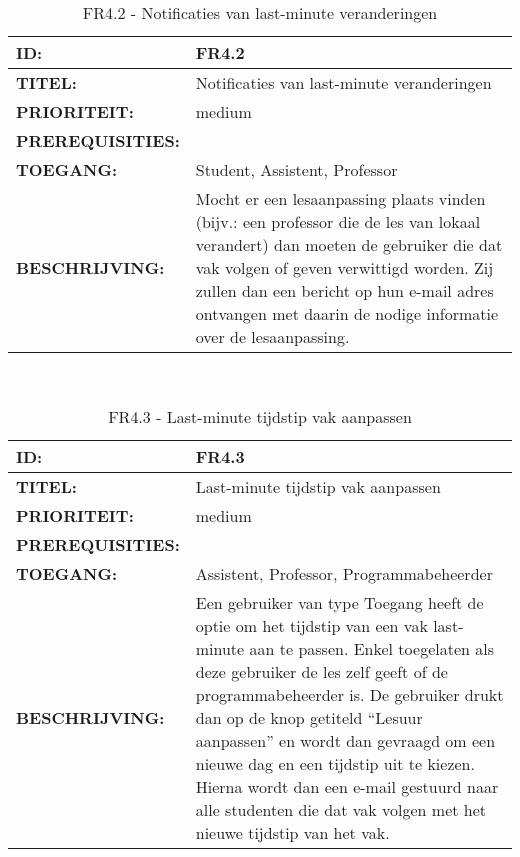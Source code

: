 \noindent\begin{table}[H]
            \begin{tabular}{l | p{10cm}}
                \textbf{ID:} & FR4.2 \\ \hline
                \textbf{TITEL:} & Notificaties van last-minute veranderingen \\ \hline
                \textbf{PRIORITEIT:} &  medium \\ \hline
                \textbf{PREREQUISITIES:} & \\ \hline
                \textbf{TOEGANG:} & Student, Assistent, Professor \\ \hline
                \textbf{BESCHRIJVING:} & Mocht er een lesaanpassing plaats vinden (bijv.: een professor die de les van lokaal verandert) dan moeten de gebruiker die dat vak volgen of geven verwittigd worden. Zij zullen dan een bericht op hun e-mail adres ontvangen met daarin de nodige informatie over de lesaanpassing.\\
            \end{tabular}\\
            \caption{FR4.2 - Notificaties van last-minute veranderingen}
			\label{tab:FR4.2 - Notificaties van last-minute veranderingen}
        \end{table}      

\noindent\begin{table}[H]
            \begin{tabular}{l | p{10cm}}
                \textbf{ID:} & FR4.3 \\ \hline
                \textbf{TITEL:} & Last-minute tijdstip vak aanpassen\\ \hline
                \textbf{PRIORITEIT:} &  medium \\ \hline
                \textbf{PREREQUISITIES:} & \\ \hline
                \textbf{TOEGANG:} & Assistent, Professor, Programmabeheerder \\ \hline
                \textbf{BESCHRIJVING:} & Een gebruiker van type Toegang heeft de optie om het tijdstip van een vak last-minute aan te passen. Enkel toegelaten als deze gebruiker de les zelf geeft of de programmabeheerder is.  De gebruiker drukt dan op de knop getiteld “Lesuur aanpassen” en wordt dan gevraagd om een nieuwe dag en een tijdstip uit te kiezen. 
                                        Hierna wordt dan een e-mail gestuurd naar alle studenten die dat vak volgen met het nieuwe tijdstip van het vak.\\ 
            \end{tabular}\\
            \caption{FR4.3 - Last-minute tijdstip vak aanpassen}
            \label{tab:FR4.3 - Last-minute tijdstip vak aanpassen}
        \end{table}
        
